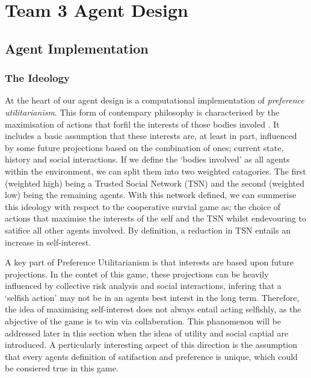 \chapter{Team 3 Agent Design}\label{team_3_agent_design}

\section{Agent Implementation}
    
    \subsection{The Ideology}

        At the heart of our agent design is a computational implementation of \textit{preference utilitarianism}. This form of contempary philosophy is characterised by the maximisation of actions that forfil the interests of those bodies involed \cite{hare1981moral}. It includes a basic assumption that these interests are, at least in part, influenced by some future projections based on the combination of ones; current state, history and social interactions. If we define the `bodies involved' as all agents within the environment, we can split them into two weighted catagories. The first (weighted high) being a Trusted Social Network (TSN) and the second (weighted low) being the remaining agents. With this network defined, we can summerise this ideology with respect to the cooperative survial game as; the choice of actions that maximise the interests of the self and the TSN whilst endevouring to satifice all other agents involved. By definition, a reduction in TSN entails an increase in self-interest. 
        
        A key part of Preference Utilitarianism is that interests are based upon future projections. In the contet of this game, these projections can be heavily influenced by collective risk analysis and social interactions, infering that a `selfish action' may not be in an agents best interst in the long term. Therefore, the idea of maximising self-interest does not always entail acting selfishly, as the abjective of the game is to win via collaberation. This phanomenon will be addressed later in this section when the ideas of utility and social captial are introduced. A perticularly interesting aspect of this direction is the assumption that every agents definition of satifaction and preference is unique, which could be consiered true in this game.  
        
